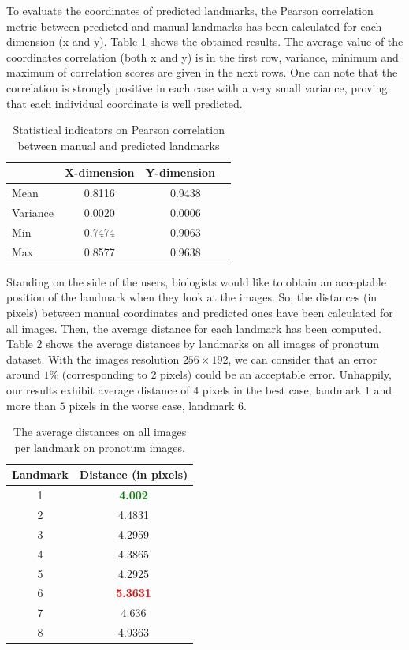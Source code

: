 \documentclass[review]{elsarticle}
\begin{document}
To evaluate the coordinates of predicted landmarks, the Pearson
correlation  metric  between predicted and manual landmarks has been
calculated for each dimension (x and y). Table \ref {tblcorrelation}
shows the obtained results. The average value of the coordinates
correlation (both x and y) is in the first row, variance,
minimum and maximum of correlation scores are given in the next
rows. One can note that the correlation is strongly positive in each
case with a very small variance, proving that each individual
coordinate is well predicted.
\begin{table}[htbp]
	\centering
	\begin{tabular}{ | l | c | c | }
\hline
	& X-dimension & Y-dimension  \  \\ \hline
	Mean & 0.8116 & 0.9438 \\ \hline
	Variance  & 0.0020 & 0.0006 \\ \hline
	Min  & 0.7474 & 0.9063 \\ \hline
	Max  & 0.8577 & 0.9638 \\ \hline
\end{tabular}
	\caption{Statistical indicators on Pearson correlation between manual and predicted landmarks}
	\label{tblcorrelation}
\end{table}

Standing on the side of the users, biologists would like to
obtain an acceptable position of the landmark when they look at the
images. So, the distances (in pixels) between manual coordinates and predicted
ones have been calculated for all images. Then, the average
distance for each landmark has been
computed. Table \ref{tblavgpronotum} shows the average distances by
landmarks on all images of pronotum dataset. With the images
resolution $256 \times 192$, we can consider that an error around $1\%$
(corresponding to $2$ pixels) could 
be an acceptable error. Unhappily, our results exhibit average
distance of $4$ pixels in the best case, landmark $1$ and more than
$5$ pixels in the worse case, landmark $6$.
\begin{table}[htbp]
	\centering	
	\begin{tabular}{|c|c|}
		\hline
		\textbf{Landmark} & \textbf{Distance} (in pixels) \\ \hline
		1 & \textcolor{green}{\textbf{4.002}}  \\ \hline
		2 & 4.4831 \\ \hline
		3 & 4.2959 \\ \hline
		4 & 4.3865 \\ \hline
		5 & 4.2925 \\ \hline
		6 & \textcolor{red}{\textbf{5.3631}} \\ \hline
		7 & 4.636 \\ \hline
		8 & 4.9363 \\ \hline
	\end{tabular}
	\caption{The average distances on all images per landmark on pronotum images.}
	\label{tblavgpronotum}
\end{table}
\end{document}
